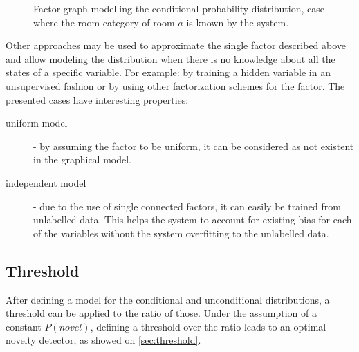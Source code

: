 \begin{figure}[h]
{
}

\caption{Factor graph modelling the conditional probability distribution, case where the
         room category of room $a$ is known by the system.}
\end{figure}
 
Other approaches may be used to approximate the single factor described above
and allow modeling the distribution when there is no knowledge about all the states
of a specific variable. For example: by training a hidden variable in an
unsupervised fashion or by using other factorization schemes for the factor.
The presented cases have interesting properties:

\begin{description}
\item[uniform model] - by assuming the factor to be uniform, it can be
considered as not existent in the graphical model.

\item[independent model] - due to the use of single connected factors,
it can easily be trained from unlabelled data. This helps the system to
account for existing bias for each of the variables without the
system overfitting to the unlabelled data.
\end{description}


\subsection{Threshold}
After defining a model for the conditional and unconditional distributions, a threshold can be applied
to the ratio of those. Under the assumption of a constant $P(novel)$, defining a threshold over the ratio 
leads to an optimal novelty detector, as showed on \autoref{sec:threshold}.

